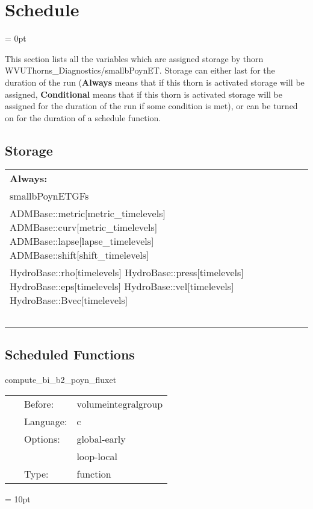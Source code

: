 \section{Schedule} 


\parskip = 0pt


\noindent This section lists all the variables which are assigned storage by thorn WVUThorns\_Diagnostics/smallbPoynET.  Storage can either last for the duration of the run ({\bf Always} means that if this thorn is activated storage will be assigned, {\bf Conditional} means that if this thorn is activated storage will be assigned for the duration of the run if some condition is met), or can be turned on for the duration of a schedule function.


\subsection*{Storage}

\hspace{5mm}

 \begin{tabular*}{160mm}{ll} 

{\bf Always:}&  ~ \\ 
 smallbPoynETGFs & ~\\ 
 ADMBase::metric[metric\_timelevels] ADMBase::curv[metric\_timelevels] ADMBase::lapse[lapse\_timelevels] ADMBase::shift[shift\_timelevels] & ~\\ 
 HydroBase::rho[timelevels] HydroBase::press[timelevels] HydroBase::eps[timelevels] HydroBase::vel[timelevels] HydroBase::Bvec[timelevels] & ~\\ 
~ & ~\\ 
\end{tabular*} 


\subsection*{Scheduled Functions}
\vspace{5mm}


\hspace{5mm} compute\_bi\_b2\_poyn\_fluxet 

\hspace{5mm}{\it set b\^mu, b\^2, and poynting flux gridfunctions. } 


\hspace{5mm}

 \begin{tabular*}{160mm}{cll} 
~ & Before:  & volumeintegralgroup \\ 
~ & Language:  & c \\ 
~ & Options:  & global-early \\ 
~& ~ &loop-local\\ 
~ & Type:  & function \\ 
\end{tabular*} 



\vspace{5mm}\parskip = 10pt 

